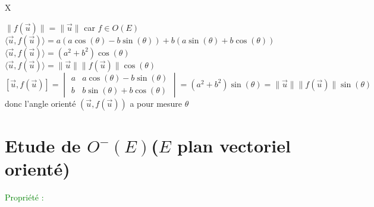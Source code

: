 X\documentclass{article}
\begin{document}
$\| f(\vec u) \|= \| \vec u \|$ car $f \in O(E)$ \\
$\langle \vec u,f(\vec u) \rangle= a(a\cos(\theta)-b\sin(\theta))+ b(a\sin(\theta)+b\cos(\theta))$ \\
$\langle \vec u,f(\vec u) \rangle= (a^2 +b^2) \cos(\theta)$ \\
$\langle \vec u,f(\vec u) \rangle= \|\vec u \| \| f(\vec u) \| \cos(\theta)$ \\
$[\vec u, f(\vec u)]= \begin{vmatrix}
a & a\cos(\theta)-b\sin(\theta) \\
b & b\sin(\theta)+ b \cos(\theta)
\end{vmatrix}=(a^2+b^2)\sin(\theta)= \|\vec u \| \| f(\vec u) \| \sin(\theta)$ \\
donc l'angle orienté $(\vec u, f(\vec u))$ a pour mesure $\theta$
\section{Etude de $O^-(E)$($E$ plan vectoriel orienté)}
\textcolor{green}{Propriété :}
\end{document}

